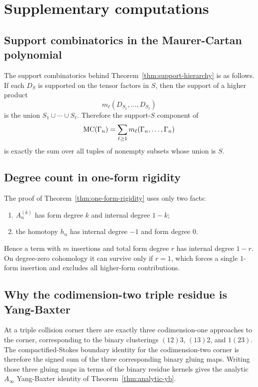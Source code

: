 \appendix

\section{Supplementary computations}

\subsection{Support combinatorics in the Maurer-Cartan polynomial}
The support combinatorics behind Theorem~\ref{thm:support-hierarchy} is as follows. If each $D_S$ is supported on the tensor factors in $S$, then the support of a higher product
\[
 m_\ell(D_{S_1},\dots,D_{S_\ell})
\]
is the union $S_1\cup\cdots\cup S_\ell$. Therefore the support-$S$ component of
\[
 \mathrm{MC}(\Gamma_n)=\sum_{\ell\ge 1}m_\ell(\Gamma_n,\dots,\Gamma_n)
\]
is exactly the sum over all tuples of nonempty subsets whose union is $S$.

\subsection{Degree count in one-form rigidity}
The proof of Theorem~\ref{thm:one-form-rigidity} uses only two facts:
\begin{enumerate}[label=\textup{(\alph*)}]
 \item $A_n^{(k)}$ has form degree $k$ and internal degree $1-k$;
 \item the homotopy $h_n$ has internal degree $-1$ and form degree $0$.
\end{enumerate}
Hence a term with $m$ insertions and total form degree $r$ has internal degree $1-r$. On degree-zero cohomology it can survive only if $r=1$, which forces a single $1$-form insertion and excludes all higher-form contributions.

\subsection{Why the codimension-two triple residue is Yang-Baxter}
At a triple collision corner there are exactly three codimension-one approaches to the corner, corresponding to the binary clusterings $(12)3$, $(13)2$, and $1(23)$. The compactified-Stokes boundary identity for the codimension-two corner is therefore the signed sum of the three corresponding binary gluing maps. Writing those three gluing maps in terms of the binary residue kernels gives the analytic $A_\infty$ Yang-Baxter identity of Theorem~\ref{thm:analytic-yb}.

